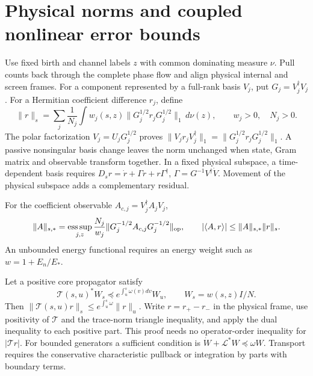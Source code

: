 \section{Physical norms and coupled nonlinear error bounds}
\label{v:physical_norm}

Use fixed birth and channel labels $z$ with common dominating measure $\nu$. Pull counts back through the complete phase flow and align physical internal and screen frames. For a component represented by a full-rank basis $V_j$, put $G_j=V_j^\dagger V_j$. For a Hermitian coefficient difference $r_j$, define
\begin{equation}
 \|r\|_s=\sum_j\frac1{N_j}\int
 w_j(s,z)\|G_j^{1/2}r_jG_j^{1/2}\|_1\,d\nu(z),
 \qquad w_j>0,\quad N_j>0 .
 \label{v:gram_trace_norm}
\end{equation}
The polar factorization $V_j=U_jG_j^{1/2}$ proves
$\|V_jr_jV_j^\dagger\|_1=\|G_j^{1/2}r_jG_j^{1/2}\|_1$.
A passive nonsingular basis change leaves the norm unchanged when state, Gram matrix and observable transform together. In a fixed physical subspace, a time-dependent basis requires $D_sr=\dot r+\Gamma r+r\Gamma^\dagger$, $\Gamma=G^{-1}V^\dagger\dot V$. Movement of the physical subspace adds a complementary residual.

For the coefficient observable $A_{c,j}=V_j^\dagger A_jV_j$,
\begin{equation}
 \|A\|_{s,*}=\mathop{\rm ess\,sup}_{j,z}
 \frac{N_j}{w_j}\|G_j^{-1/2}A_{c,j}G_j^{-1/2}\|_{\rm op},
 \qquad |\langle A,r\rangle|\le\|A\|_{s,*}\|r\|_s .
 \label{v:dual_norm}
\end{equation}
An unbounded energy functional requires an energy weight such as $w=1+E_n/E_*$.

Let a positive core propagator satisfy
\begin{equation}
 \mathcal T(s,u)^*W_s\preceq
 e^{\int_u^s\omega(v)dv}W_u,\qquad W_s=w(s,z)I/N .
 \label{v:dual_weight}
\end{equation}
Then $\|\mathcal T(s,u)r\|_s\le e^{\int_u^s\omega}\|r\|_u$.
Write $r=r_+-r_-$ in the physical frame, use positivity of $\mathcal T$ and the trace-norm triangle inequality, and apply the dual inequality to each positive part. This proof needs no operator-order inequality for $|\mathcal Tr|$. For bounded generators a sufficient condition is $\dot W+\mathcal L^*W\preceq\omega W$. Transport requires the conservative characteristic pullback or integration by parts with boundary terms.

